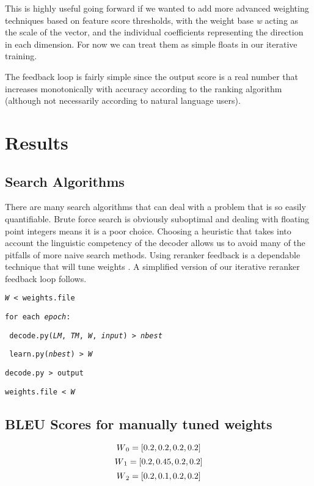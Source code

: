 \documentclass[11pt,letterpaper]{article}
\begin{document}
This is highly useful going forward if we wanted to add more advanced weighting techniques based on feature score thresholds, with the weight base \textit{w} acting as the scale of the vector, and the individual coefficients representing the direction in each dimension. For now we can treat them as simple floats in our iterative training. 

The feedback loop is fairly simple since the output score is a real number that increases monotonically with accuracy according to the ranking algorithm (although not necessarily according to natural language users). 

\section{Results}

\subsection{Search Algorithms}

There are many search algorithms that can deal with a problem that is so easily quantifiable. Brute force search is obviously suboptimal and dealing with floating point integers means it is a poor choice. Choosing a heuristic that takes into account the linguistic competency of the decoder allows us to avoid many of the pitfalls of more naive search methods. Using reranker feedback is a dependable technique that will tune weights \cite{HopkinsMay}. A simplified version of our iterative reranker feedback loop follows.


\noindent\texttt{\scriptsize{\textit{W} < weights.file}}

\noindent\texttt{\scriptsize{for each \textit{epoch}:}}

\noindent\texttt{\scriptsize{  decode.py(\textit{LM}, \textit{TM}, \textit{W}, \textit{input}) > \textit{nbest}}}

\noindent\texttt{\scriptsize{	 learn.py(\textit{nbest}) > \textit{W} }}

\noindent\texttt{\scriptsize{decode.py > output}}

\noindent\texttt{\scriptsize{weights.file < \textit{W} }}


\subsection{BLEU Scores for manually tuned weights}

\begin{displaymath}
W\textsubscript{0} = [0.2,  0.2,  0.2,  0.2]
\end{displaymath}
\begin{displaymath}
W\textsubscript{1} = [0.2,  0.45,  0.2,  0.2]
\end{displaymath}
\begin{displaymath}
W\textsubscript{2} = [0.2,  0.1,  0.2,  0.2]
\end{displaymath}
\end{document}
